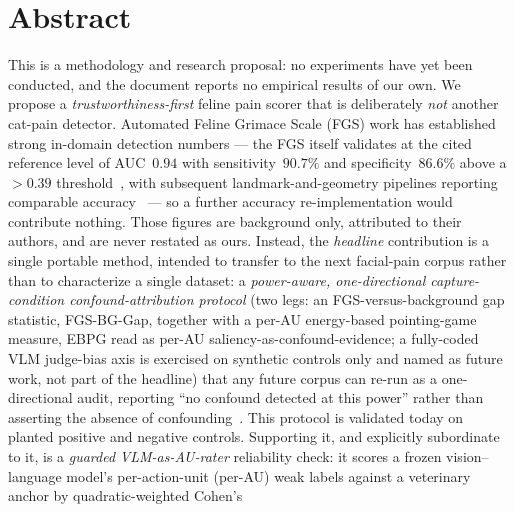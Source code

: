 
\chapter*{Abstract}
\label{ch:abstract}

This is a methodology and research proposal: no experiments have yet been
conducted, and the document reports no empirical results of our own. We
propose a \emph{trustworthiness-first} feline pain scorer that is deliberately
\emph{not} another cat-pain detector. Automated Feline Grimace Scale (FGS) work
has established strong in-domain detection numbers --- the FGS itself validates
at the cited reference level of AUC~$0.94$ with sensitivity~$90.7\%$ and
specificity~$86.6\%$ above a $>0.39$ threshold~\cite{evangelista2019}, with
subsequent landmark-and-geometry pipelines reporting comparable
accuracy~\cite{steagall2023, feighelstein2023} --- so a further accuracy
re-implementation would contribute nothing. Those figures are background only,
attributed to their authors, and are never restated as ours. Instead, the
\emph{headline} contribution is a single portable method, intended to transfer
to the next facial-pain corpus rather than to characterize a single dataset: a
\emph{power-aware, one-directional capture-condition confound-attribution
protocol} (two legs: an FGS-versus-background gap statistic, FGS-BG-Gap, together with a
per-AU energy-based pointing-game measure, EBPG read as per-AU
saliency-as-confound-evidence; a fully-coded VLM judge-bias axis is exercised on
synthetic controls only and named as future work, not part of the headline) that any future
corpus can re-run as a one-directional audit, reporting ``no confound detected
at this power'' rather than asserting the absence of confounding~\cite{adebayo2022posthoc}. This protocol
is validated today on planted positive and negative controls. Supporting it,
and explicitly subordinate to it, is a \emph{guarded} \emph{VLM-as-AU-rater}
reliability check: it scores a frozen vision--language model's per-action-unit
(per-AU) weak labels against a veterinary anchor by quadratic-weighted Cohen's
